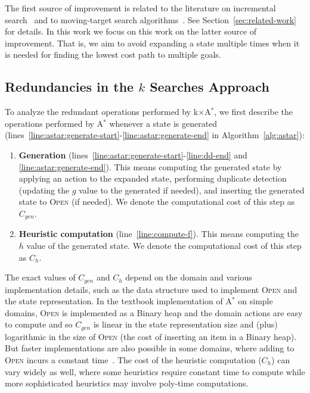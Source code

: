 \documentclass{aicom2e}
\newcommand{\astar}{A$^*$}
\newcommand{\kxastar}{k$\times$A$^*$}
\newcommand{\open}{\textsc{Open}}
\begin{document}
The first source of improvement is related to the literature on incremental
search~\cite{koenig2004lifelong} and to moving-target search
algorithms~\cite{ishida1995moving,koenig2007speeding}. See
Section~\ref{sec:related-work} for details. In this work we focus on this work
on the latter source of improvement. That is, we aim to avoid expanding a state
multiple times when it is needed for finding the lowest cost path to multiple goals.


\subsection{Redundancies in the $k$ Searches Approach}


To analyze the redundant operations performed by \kxastar{}, we first describe
the operations performed by \astar{} whenever a state is generated
(lines~\ref{line:astar:generate-start}-\ref{line:astar:generate-end} in
Algorithm~\ref{alg:astar}):

\begin{enumerate}
	\item {\bf Generation}  (lines~\ref{line:astar:generate-start}-\ref{line:dd-end} and \ref{line:astar:generate-end}). 
	This means computing the generated state by applying an action to the expanded state, 
	performing duplicate detection (updating the $g$ value to the generated if needed), 
	and inserting the generated state to \open{} (if needed). 
	We denote the computational cost of this step as $C_{gen}$.
	
		
	\item {\bf Heuristic computation}  (line~\ref{line:compute-f}). This means computing the $h$ value of the generated state. 
	We denote the computational cost of this step as $C_{h}$.
\end{enumerate}	
The exact values of $C_{gen}$ and $C_h$ depend on the domain and various implementation details, 
such as the data structure used to implement \open{} and the state representation. 
In the textbook implementation of \astar{} on simple domains, 
\open{} is implemented as a Binary heap and the domain actions are easy to compute 
and so $C_{gen}$ is linear in the state representation size and (plus) logarithmic in the size of \open{} 
(the cost of inserting an item in a Binary heap). 
But faster implementations are also possible in some domains, where adding to \open{} incurs a constant time~\cite{GILON2016,BurnsHLR12}.
The cost of the heuristic computation ($C_h$) can vary widely as well, 
where some heuristics require constant time to compute while more sophisticated heuristics may involve poly-time computations. 
\end{document}

